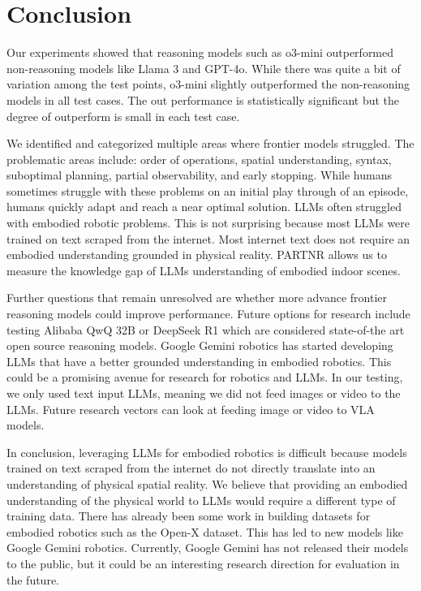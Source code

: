 \section{Conclusion}

Our experiments showed that reasoning models such as o3-mini outperformed non-reasoning models like Llama 3 and GPT-4o.  While there was quite a bit of variation among the test points, o3-mini slightly outperformed the non-reasoning models in all test cases.  The out performance is statistically significant but the degree of outperform is small in each test case.

We identified and categorized multiple areas where frontier models struggled.  The problematic areas include: order of operations, spatial understanding, syntax, suboptimal planning, partial observability, and early stopping.  While humans sometimes struggle with these problems on an initial play through of an episode, humans quickly adapt and reach a near optimal solution.  LLMs often struggled with embodied robotic problems.  This is not surprising because most LLMs were trained on text scraped from the internet.  Most internet text does not require an embodied understanding grounded in physical reality.  PARTNR allows us to measure the knowledge gap of LLMs understanding of embodied indoor scenes.

Further questions that remain unresolved are whether more advance frontier reasoning models could improve performance.  Future options for research include testing Alibaba QwQ 32B or DeepSeek R1 which are considered state-of-the art open source reasoning models.  Google Gemini robotics\cite{geminiroboticsteam2025geminiroboticsbringingai} has started developing LLMs that have a better grounded understanding in embodied robotics.  This could be a promising avenue for research for robotics and LLMs.  In our testing, we only used text input LLMs, meaning we did not feed images or video to the LLMs.  Future research vectors can look at feeding image or video to VLA models.

In conclusion, leveraging LLMs for embodied robotics is difficult because models trained on text scraped from the internet do not directly translate into an understanding of physical spatial reality.  We believe that providing an embodied understanding of the physical world to LLMs would require a different type of training data.  There has already been some work in building datasets for embodied robotics such as the Open-X\cite{embodimentcollaboration2024openxembodimentroboticlearning} dataset.  This has led to new models like Google Gemini robotics.  Currently, Google Gemini has not released their models to the public, but it could be an interesting research direction for evaluation in the future.